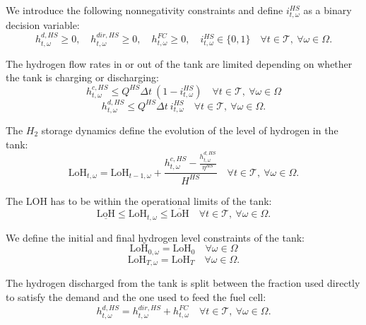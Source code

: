 \documentclass{article}
\newcommand{\LOH}{\text{LoH}}
\begin{document}
We introduce the following nonnegativity constraints and define $i^{HS}_{t, \omega}$ as a binary decision variable:
\begin{equation} \label{EQ:HS_nonnegativity}
    h^{d,HS}_{t,\omega} \geq 0, \quad h^{dir,HS}_{t,\omega} \geq 0, \quad h^{FC}_{t, \omega} \geq 0, \quad i^{HS}_{t,\omega} \in \{0,1\} \quad \forall t \in \mathcal{T}, \ \forall \omega \in \Omega.
\end{equation}

The hydrogen flow rates in or out of the tank are limited depending on whether the tank is charging or discharging:
\begin{equation} \label{EQ:HS_charge}
    h^{c,HS}_{t,\omega} \leq Q^{HS} \Delta t \ (1 - i^{HS}_{t,\omega}) \quad \forall t \in \mathcal{T}, \ \forall \omega \in \Omega
\end{equation}
\begin{equation} \label{EQ:HS_discharge}
    h^{d,HS}_{t,\omega} \leq Q^{HS} \Delta t \  i^{HS}_{t,\omega} \quad \forall t \in \mathcal{T}, \ \forall \omega \in \Omega.
\end{equation}

The $H_{2}$ storage dynamics define the evolution of the level of hydrogen in the tank:
\begin{equation} \label{EQ:HS_dynamics}
    \LOH_{t,\omega} = \LOH_{t-1,\omega} + \frac{h^{c,HS}_{t,\omega} - \frac{h^{d,HS}_{t,\omega}}{\eta^{HS}}}{H^{HS}} \quad \forall t \in \mathcal{T}, \ \forall \omega \in \Omega.
\end{equation}

The LOH has to be within the operational limits of the tank:
\begin{equation} \label{EQ:LOHperLimits}
	\underline{\LOH} \leq \LOH_{t, \omega} \leq \overline{\LOH} \quad \forall t \in \mathcal{T}, \ \forall \omega \in \Omega.
\end{equation}

We define the initial and final hydrogen level constraints of the tank:
\begin{equation} \label{EQ:HS_initial}
    \LOH_{0,\omega} = \LOH_0 \quad \forall \omega \in \Omega
\end{equation}
\begin{equation} \label{EQ:HS_final}
    \LOH_{T,\omega} = \LOH_T \quad \forall \omega \in \Omega.
\end{equation}

The hydrogen discharged from the tank is split between the fraction used directly to satisfy the demand and the one used to feed the fuel cell:
\begin{equation} \label{EQ:HS_split}
    h^{d,HS}_{t,\omega} = h^{dir,HS}_{t,\omega} + h^{FC}_{t,\omega} \quad \forall t \in \mathcal{T}, \ \forall \omega \in \Omega.
\end{equation}
\end{document}

